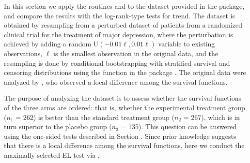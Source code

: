 In this section we apply the routines  and  %
to the dataset  provided in the  package, and compare the results with the log-rank-type tests for trend. %
The dataset is obtained by %
resampling from a perturbed dataset of patients from a randomized clinical trial for the treatment of major depression, where the perturbation is achieved by adding a random $\mbox{U}(-0.01\ell, 0.01\ell)$ variable to existing observations, $\ell$ is the smallest observation in the original data, and the resampling is done by conditional bootstrapping with stratified survival and censoring distributions using the  function in the package  \citep[][]{boot:2019}.
The original data were analyzed by \citet{CM:2019}, who observed a local difference among the survival functions. 


The purpose of analyzing the  dataset is to assess whether the survival functions of the three arms are ordered: that is, whether the experimental treatment group ($n_1$ = 262) is better than the standard treatment group ($n_2$ = 267), which is in turn superior to the placebo group ($n_3$ = 135). This question can be answered using the one-sided tests described in Section .
Since prior knowledge suggests that there is a local difference among the survival functions, %
here we conduct the maximally selected EL test via . %

